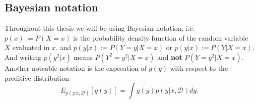 \subsection{Bayesian notation}
Throughout this thesis we will be using Bayesian notation, i.e. $p(x) := P(X=x)$ is the probability
density function of the random variable $X$ evaluated in $x$. and $p(y|x) := P(Y=y|X=x)$ or $p(y|x)
:= P(Y|X=x)$. And writing $p(y^2|x)$ means $P(Y^2=y^2|X=x)$ and \textbf{not} $P(Y=y^2|X=x)$. 
Another noteable notation is the expecation of $g(y)$ with respect to the preditive distribution 
$$E_{p(y|x,\mathcal{D})}[g(y)] = \int g(y) p(y|x,\mathcal{D}) dy.$$

